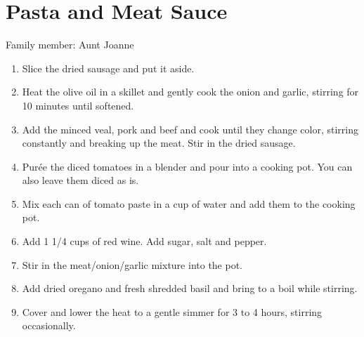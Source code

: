 \chapter{Pasta and Meat Sauce}
\label{ch:pastameatsauce}


Family member: Aunt Joanne

\begin{enumerate}
    \item Slice the dried sausage and put it aside.
    \item Heat the olive oil in a skillet and gently cook the onion and garlic, stirring for 10 minutes until softened.
    \item Add the minced veal, pork and beef and cook until they change color, stirring constantly and breaking up the meat. Stir in the dried sausage.
    \item Purée the diced tomatoes in a blender and pour into a cooking pot. You can also leave them diced as is.
    \item Mix each can of tomato paste in a cup of water and add them to the cooking pot.
    \item Add 1 1/4 cups of red wine. Add sugar, salt and pepper.
    \item Stir in the meat/onion/garlic mixture into the pot.
    \item Add dried oregano and fresh shredded basil and bring to a boil while stirring.
    \item Cover and lower the heat to a gentle simmer for 3 to 4 hours, stirring occasionally.
\end{enumerate}

